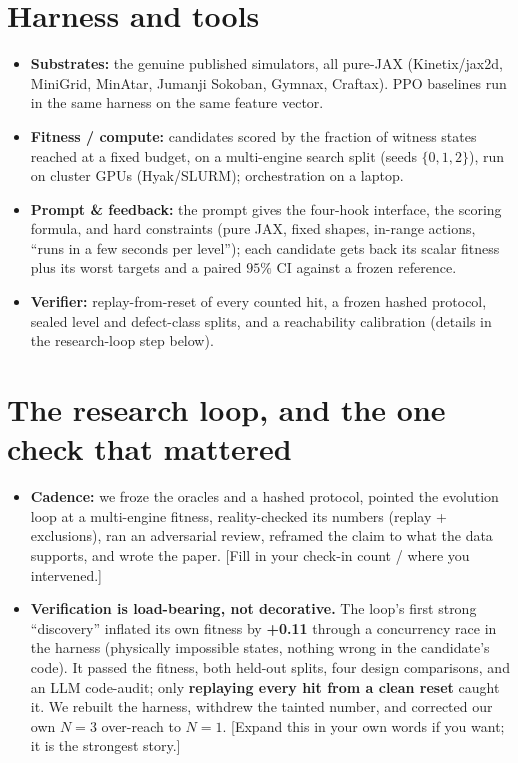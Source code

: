 \section{Harness and tools}
\label{sec:harness}
\begin{itemize}\itemsep2pt
  \item \textbf{Substrates:} the genuine published simulators, all pure-JAX (Kinetix/jax2d, MiniGrid, MinAtar, Jumanji
  Sokoban, Gymnax, Craftax). PPO baselines run in the same harness on the same feature vector.
  \item \textbf{Fitness / compute:} candidates scored by the fraction of witness states reached at a fixed budget, on a
  multi-engine search split (seeds $\{0,1,2\}$), run on cluster GPUs (Hyak/SLURM); orchestration on a laptop.
  \item \textbf{Prompt \& feedback:} the prompt gives the four-hook interface, the scoring formula, and hard constraints
  (pure JAX, fixed shapes, in-range actions, ``runs in a few seconds per level''); each candidate gets back its scalar
  fitness plus its worst targets and a paired $95\%$ CI against a frozen reference.
  \item \textbf{Verifier:} replay-from-reset of every counted hit, a frozen hashed protocol, sealed level and defect-class
  splits, and a reachability calibration (details in the research-loop step below).
\end{itemize}

\section{The research loop, and the one check that mattered}
\label{sec:loop}
\begin{itemize}\itemsep2pt
  \item \textbf{Cadence:} we froze the oracles and a hashed protocol, pointed the evolution loop at a multi-engine
  fitness, reality-checked its numbers (replay + exclusions), ran an adversarial review, reframed the claim to what the
  data supports, and wrote the paper. [Fill in your check-in count / where you intervened.]
  \item \textbf{Verification is load-bearing, not decorative.} The loop's first strong ``discovery'' inflated its own
  fitness by \textbf{+0.11} through a concurrency race in the harness (physically impossible states, nothing wrong in the
  candidate's code). It passed the fitness, both held-out splits, four design comparisons, and an LLM code-audit; only
  \textbf{replaying every hit from a clean reset} caught it. We rebuilt the harness, withdrew the tainted number, and
  corrected our own $N{=}3$ over-reach to $N{=}1$. [Expand this in your own words if you want; it is the strongest story.]
\end{itemize}

